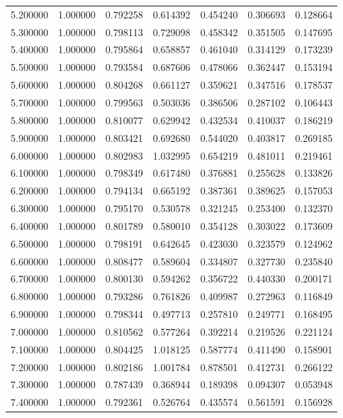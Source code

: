 \begin{table}
\begin{tabular}{rrrrrrr}
5.200000 & 1.000000 & 0.792258 & 0.614392 & 0.454240 & 0.306693 & 0.128664 \\
5.300000 & 1.000000 & 0.798113 & 0.729098 & 0.458342 & 0.351505 & 0.147695 \\
5.400000 & 1.000000 & 0.795864 & 0.658857 & 0.461040 & 0.314129 & 0.173239 \\
5.500000 & 1.000000 & 0.793584 & 0.687606 & 0.478066 & 0.362447 & 0.153194 \\
5.600000 & 1.000000 & 0.804268 & 0.661127 & 0.359621 & 0.347516 & 0.178537 \\
5.700000 & 1.000000 & 0.799563 & 0.503036 & 0.386506 & 0.287102 & 0.106443 \\
5.800000 & 1.000000 & 0.810077 & 0.629942 & 0.432534 & 0.410037 & 0.186219 \\
5.900000 & 1.000000 & 0.803421 & 0.692680 & 0.544020 & 0.403817 & 0.269185 \\
6.000000 & 1.000000 & 0.802983 & 1.032995 & 0.654219 & 0.481011 & 0.219461 \\
6.100000 & 1.000000 & 0.798349 & 0.617480 & 0.376881 & 0.255628 & 0.133826 \\
6.200000 & 1.000000 & 0.794134 & 0.665192 & 0.387361 & 0.389625 & 0.157053 \\
6.300000 & 1.000000 & 0.795170 & 0.530578 & 0.321245 & 0.253400 & 0.132370 \\
6.400000 & 1.000000 & 0.801789 & 0.580010 & 0.354128 & 0.303022 & 0.173609 \\
6.500000 & 1.000000 & 0.798191 & 0.642645 & 0.423030 & 0.323579 & 0.124962 \\
6.600000 & 1.000000 & 0.808477 & 0.589604 & 0.334807 & 0.327730 & 0.235840 \\
6.700000 & 1.000000 & 0.800130 & 0.594262 & 0.356722 & 0.440330 & 0.200171 \\
6.800000 & 1.000000 & 0.793286 & 0.761826 & 0.409987 & 0.272963 & 0.116849 \\
6.900000 & 1.000000 & 0.798344 & 0.497713 & 0.257810 & 0.249771 & 0.168495 \\
7.000000 & 1.000000 & 0.810562 & 0.577264 & 0.392214 & 0.219526 & 0.221124 \\
7.100000 & 1.000000 & 0.804425 & 1.018125 & 0.587774 & 0.411490 & 0.158901 \\
7.200000 & 1.000000 & 0.802186 & 1.001784 & 0.878501 & 0.412731 & 0.266122 \\
7.300000 & 1.000000 & 0.787439 & 0.368944 & 0.189398 & 0.094307 & 0.053948 \\
7.400000 & 1.000000 & 0.792361 & 0.526764 & 0.435574 & 0.561591 & 0.156928 \\

\end{tabular}
\end{table}
